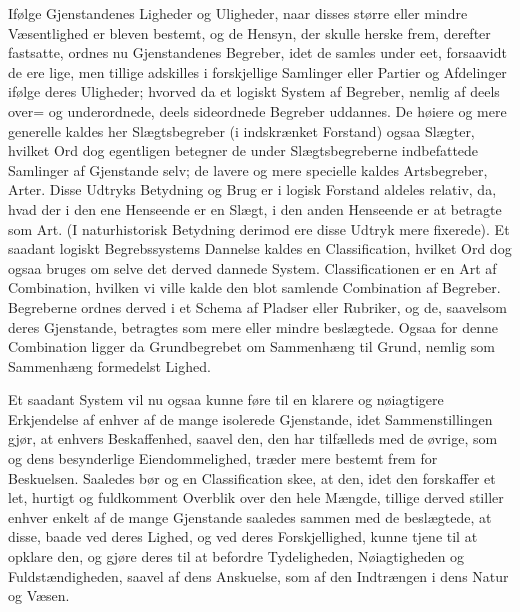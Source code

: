 \documentclass[12pt]{book}
\makeatletter
\def\textit#1{#1}%
\def\emph#1{#1}%
\newcommand{\umph}[2][misc]{%
  \@ifundefined{umph@#1@on}{#2}{\emph{#2}}}
\newcommand{\opage}[1]{\marginnote{\footnotesize\textit{[#1]}}}
\makeatother
\begin{document}
Ifølge Gjenstandenes Ligheder og Uligheder, naar disses større eller mindre
Væsentlighed er bleven bestemt, og de Hensyn, der skulle herske frem, derefter
fastsatte, ordnes nu Gjenstandenes Begreber, idet de samles under eet,
forsaavidt de ere lige, men tillige adskilles i forskjellige Samlinger eller
Partier og Afdelinger ifølge deres Uligheder; hvorved da et logiskt System af
Begreber, nemlig af deels over= og underordnede, deels sideordnede Begreber
uddannes. De høiere og mere generelle kaldes her \emph{Slægtsbegreber} (i
indskrænket Forstand) ogsaa \emph{Slægter}, hvilket Ord dog egentligen betegner
de under Slægtsbegreberne indbefattede Samlinger af Gjenstande selv; de lavere og
mere specielle kaldes \emph{Artsbegreber, Arter}. Disse Udtryks Betydning og Brug
er i logisk Forstand aldeles relativ, da, hvad der i den ene Henseende er en
Slægt, i den anden Henseende er at betragte som Art. (I naturhistorisk Betydning
derimod ere disse Udtryk mere fixerede). Et saadant logiskt Begrebssystems
Dannelse kaldes en \emph{Classification}, hvilket Ord dog ogsaa bruges om selve
det derved dannede System. Classificationen er en Art af Combination, hvilken vi
ville kalde
\opage{199} den blot \emph{samlende Combination} af Begreber. Begreberne ordnes derved i et
Schema af Pladser eller Rubriker, og de, saavelsom deres Gjenstande, betragtes
som mere eller mindre beslægtede. Ogsaa for denne Combination ligger da
Grundbegrebet om Sammenhæng til Grund, nemlig som Sammenhæng formedelst Lighed.

Et saadant System vil nu ogsaa kunne føre til en klarere og nøiagtigere
Erkjendelse af enhver af de mange isolerede Gjenstande, idet Sammenstillingen
gjør, at enhvers Beskaffenhed, saavel den, den har tilfælleds med de øvrige, som
og dens besynderlige Eiendommelighed, træder mere bestemt frem for Beskuelsen.
Saaledes bør og en Classification skee, at den, idet den forskaffer et let,
hurtigt og fuldkomment Overblik over den hele Mængde, tillige derved stiller
enhver enkelt af de mange Gjenstande saaledes sammen med de beslægtede, at disse,
baade ved deres Lighed, og ved deres Forskjellighed, kunne tjene til at opklare
den, og gjøre deres til at befordre Tydeligheden, Nøiagtigheden og
Fuldstændigheden, saavel af dens Anskuelse, som af den
\umph[schwab]{intellectuelle} Indtrængen i dens Natur og Væsen.
\end{document}
